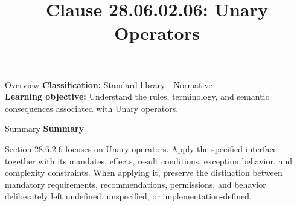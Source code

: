 \documentclass[10pt,letterpaper]{article}
\title{Clause 28.06.02.06: Unary Operators}
\author{}
\date{}
\begin{document}
\maketitle
\begin{CornellOverviewBox}{Overview}
\textbf{Classification:} Standard library - Normative\\[2pt]
\textbf{Learning objective:} Understand the rules, terminology, and semantic consequences associated with Unary operators.
\end{CornellOverviewBox}\begin{CornellSummaryBox}{Summary}
{\sffamily\bfseries\color{Accent} Summary}\par\vspace{3pt}Section 28.6.2.6 focuses on Unary operators. Apply the specified interface together with its mandates, effects, result conditions, exception behavior, and complexity constraints. When applying it, preserve the distinction between mandatory requirements, recommendations, permissions, and behavior deliberately left undefined, unspecified, or implementation-defined.
\end{CornellSummaryBox}
\end{document}

